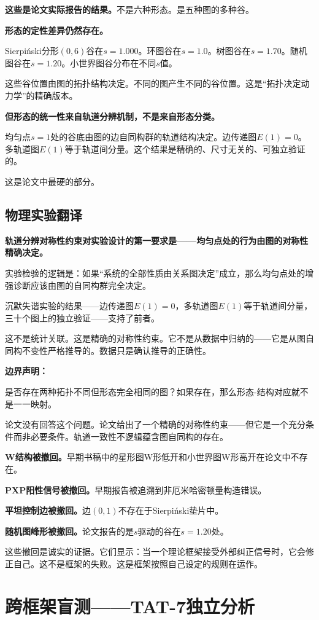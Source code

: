 \documentclass[11pt,a4paper]{book}
\theoremstyle{definition}
\begin{document}
\textbf{这些是论文实际报告的结果。}不是六种形态。是五种图的多种谷。

\textbf{形态的定性差异仍然存在。}

Sierpiński分形$(0,6)$谷在$s=1.000$。环图谷在$s=1.0$。树图谷在$s=1.70$。随机图谷在$s=1.20$。小世界图谷分布在不同$s$值。

这些谷位置由图的拓扑结构决定。不同的图产生不同的谷位置。这是“拓扑决定动力学”的精确版本。

\textbf{但形态的统一性来自轨道分辨机制，不是来自形态分类。}

均匀点$s=1$处的谷底由图的边自同构群的轨道结构决定。边传递图$E(1)=0$。多轨道图$E(1)$等于轨道间分量。这个结果是精确的、尺寸无关的、可独立验证的。

这是论文中最硬的部分。

\section{物理实验翻译}

\textbf{轨道分辨对称性约束对实验设计的第一要求是——均匀点处的行为由图的对称性精确决定。}

实验检验的逻辑是：如果“系统的全部性质由关系图决定”成立，那么均匀点处的增强诊断应该由图的自同构群完全决定。

沉默失谐实验的结果——边传递图$E(1)=0$，多轨道图$E(1)$等于轨道间分量，三十个图上的独立验证——支持了前者。

这不是统计关联。这是精确的对称性约束。它不是从数据中归纳的——它是从图自同构不变性严格推导的。数据只是确认推导的正确性。

\textbf{边界声明：}

是否存在两种拓扑不同但形态完全相同的图？如果存在，那么形态-结构对应就不是一一映射。

论文没有回答这个问题。论文给出了一个精确的对称性约束——但它是一个充分条件而非必要条件。轨道一致性不逻辑蕴含图自同构的存在。

\textbf{W结构被撤回。}早期书稿中的星形图W形低开和小世界图W形高开在论文中不存在。

\textbf{PXP阳性信号被撤回。}早期报告被追溯到非厄米哈密顿量构造错误。

\textbf{平坦控制边被撤回。}边$(0,1)$不存在于Sierpiński垫片中。

\textbf{随机图峰形被撤回。}论文报告的是$s$驱动的谷在$s=1.20$处。

这些撤回是诚实的证据。它们显示：当一个理论框架接受外部纠正信号时，它会修正自己。这不是框架的失败。这是框架按照自己设定的规则在运作。

\chapter{跨框架盲测——TAT-7独立分析}
\end{document}
